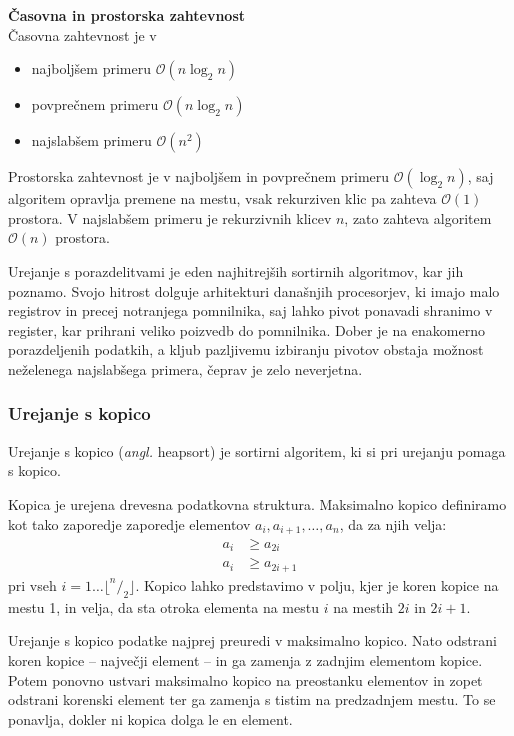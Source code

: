 \documentclass[a4paper,oneside,12pt]{article}
\newcommand{\subsubsubsection}[1]{\vspace*{1ex}\textbf{#1}\\}
\begin{document}
\subsubsubsection{Časovna in prostorska zahtevnost} \nopagebreak
Časovna zahtevnost je v \nopagebreak
\begin{itemize}
  \item najboljšem primeru $\mathcal{O}(n\log_2 n)$
  \item povprečnem primeru $\mathcal{O}(n\log_2 n)$
  \item najslabšem primeru $\mathcal{O}(n^2)$
\end{itemize}

Prostorska zahtevnost je v najboljšem in povprečnem primeru $\mathcal{O}(\log_2 n)$, 
saj algoritem opravlja premene na mestu, vsak rekurziven klic pa zahteva $\mathcal{O}(1)$ prostora.
V najslabšem primeru je rekurzivnih klicev $n$, zato zahteva algoritem $\mathcal{O}(n)$ prostora.

Urejanje s porazdelitvami je eden najhitrejših sortirnih algoritmov, kar jih
poznamo. Svojo hitrost dolguje arhitekturi današnjih procesorjev, ki imajo
malo registrov in precej notranjega pomnilnika, saj lahko pivot ponavadi shranimo v
register, kar prihrani veliko poizvedb do pomnilnika. Dober je na enakomerno
porazdeljenih podatkih, a kljub pazljivemu izbiranju pivotov obstaja možnost neželenega
najslabšega primera, čeprav je zelo neverjetna. 

\subsubsection{Urejanje s kopico}
\label{chapter:heapsort}
Urejanje s kopico (\emph{angl.} heapsort) je sortirni algoritem,
ki si pri urejanju pomaga s kopico.
\newline

Kopica je urejena drevesna podatkovna struktura.
Maksimalno kopico definiramo kot tako zaporedje zaporedje elementov $a_i, a_{i+1}, \ldots,
a_n$, da za njih velja:
\begin{align*}
  a_i &\geq a_{2i} \\
  a_i &\geq a_{2i+1}
\end{align*}
pri vseh $i = 1 \ldots \lfloor ^n/_2 \rfloor$.
Kopico lahko predstavimo v polju, kjer je koren kopice na mestu 1, in velja, da sta otroka
elementa na mestu $i$ na mestih $2i$ in $2i + 1$.

Urejanje s kopico podatke najprej preuredi v maksimalno kopico. Nato odstrani koren kopice
-- največji element -- in ga zamenja z zadnjim elementom kopice. Potem ponovno ustvari
maksimalno kopico na preostanku elementov in zopet odstrani korenski element ter ga
zamenja s tistim na predzadnjem mestu. To se ponavlja, dokler ni kopica dolga le en
element. 
\end{document}
